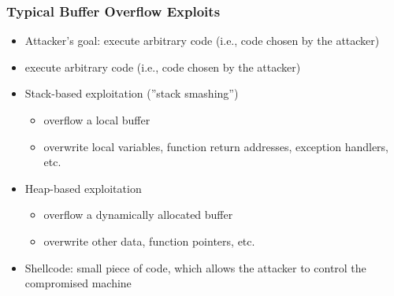 \documentclass[final]{article}
\begin{document}
\subsubsection*{Typical Buffer Overflow Exploits}
\begin{itemize}[nosep]
    \item Attacker's goal: execute arbitrary code (i.e., code chosen by the attacker)
    \item execute arbitrary code (i.e., code chosen by the attacker)
    \item Stack-based exploitation (''stack smashing'')
          \begin{itemize}[nosep]
              \item overflow a local buffer
              \item overwrite local variables, function return addresses, exception handlers, etc.
          \end{itemize}
    \item Heap-based exploitation
          \begin{itemize}
              \item overflow a dynamically allocated buffer
              \item overwrite other data, function pointers, etc.
          \end{itemize}
    \item Shellcode: small piece of code, which allows the attacker to control the compromised machine
\end{itemize}
\end{document}
